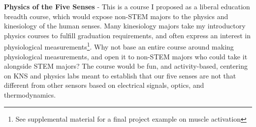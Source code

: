 \documentclass[../../main.tex]{subfiles}
\begin{document}
\textbf{Physics of the Five Senses} - This is a course I proposed as a liberal education breadth course, which would expose non-STEM majors to the physics and kinesiology of the human senses.  Many kinesiology majors take my introductory physics courses to fulfill graduation requirements, and often express an interest in physiological measurements\footnote{See supplemental material for a final project example on muscle activation}.  Why not base an entire course around making physiological measurements, and open it to non-STEM majors who could take it alongside STEM majors?  The course would be fun, and activity-based, centering on KNS and physics labs meant to establish that our five senses are not that different from other sensors based on electrical signals, optics, and thermodynamics.
\end{document}
